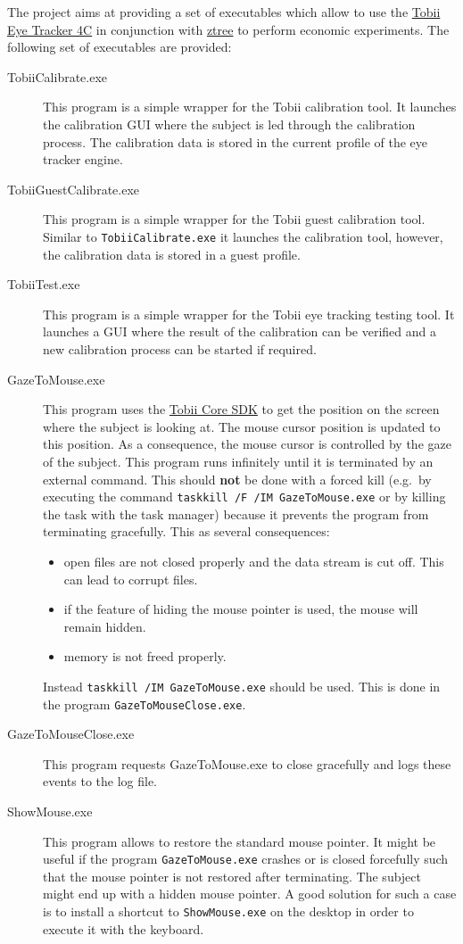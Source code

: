 \documentclass[a4paper,oneside]{book}
\begin{document}
The project aims at providing a set of executables which allow to use the \href{https://tobiigaming.com/eye-tracker-4c/}{Tobii Eye Tracker 4C} in conjunction with \href{http://www.ztree.uzh.ch/en.html}{ztree} to perform economic experiments.
The following set of executables are provided:
\begin{description}
    \item[TobiiCalibrate.exe] This program is a simple wrapper for the Tobii calibration tool.
        It launches the calibration GUI where the subject is led through the calibration process.
        The calibration data is stored in the current profile of the eye tracker engine.
    \item[TobiiGuestCalibrate.exe] This program is a simple wrapper for the Tobii guest calibration tool.
        Similar to \texttt{TobiiCalibrate.exe} it launches the calibration tool, however, the calibration data is stored in a guest profile.
    \item[TobiiTest.exe] This program is a simple wrapper for the Tobii eye tracking testing tool.
        It launches a GUI where the result of the calibration can be verified and a new calibration process can be started if required.
    \item[GazeToMouse.exe] This program uses the \href{http://developer.tobii.com/tobii-core-sdk/}{Tobii Core SDK} to get the position on the screen where the subject is looking at.
        The mouse cursor position is updated to this position.
        As a consequence, the mouse cursor is controlled by the gaze of the subject.
        This program runs infinitely until it is terminated by an external command.
        This should \textbf{not} be done with a forced kill (e.g.~by executing the command \texttt{taskkill /F /IM GazeToMouse.exe} or by killing the task with the task manager) because it prevents the program from terminating gracefully.
        This as several consequences:
        \begin{itemize}
            \item open files are not closed properly and the data stream is cut off. This can lead to corrupt files.
            \item if the feature of hiding the mouse pointer is used, the mouse will remain hidden.
            \item memory is not freed properly.
        \end{itemize}
        Instead \texttt{taskkill /IM GazeToMouse.exe} should be used.
        This is done in the program \texttt{GazeToMouseClose.exe}.
    \item[GazeToMouseClose.exe] This program requests GazeToMouse.exe to close gracefully and logs these events to the log file.
    \item[ShowMouse.exe] This program allows to restore the standard mouse pointer.
        It might be useful if the program \texttt{GazeToMouse.exe} crashes or is closed forcefully such that the mouse pointer is not restored after terminating.
        The subject might end up with a hidden mouse pointer.
        A good solution for such a case is to install a shortcut to \texttt{ShowMouse.exe} on the desktop in order to execute it with the keyboard.
\end{description}
\end{document}
